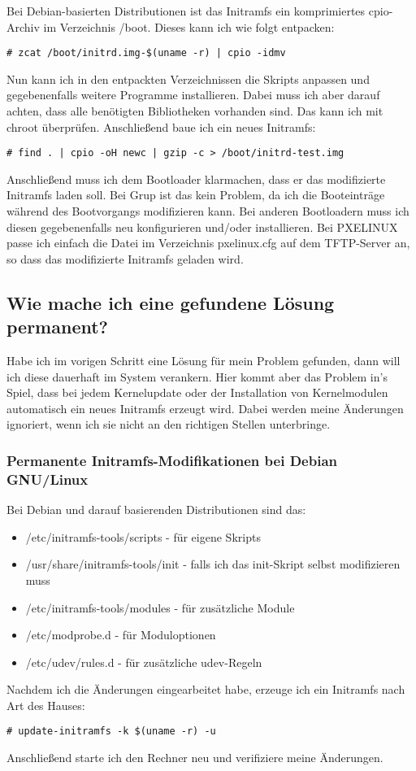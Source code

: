 Bei Debian-basierten Distributionen ist das Initramfs ein komprimiertes
cpio-Archiv im Verzeichnis /boot.
Dieses kann ich wie folgt entpacken:
\begin{verbatim}
# zcat /boot/initrd.img-$(uname -r) | cpio -idmv
\end{verbatim}
Nun kann ich in den entpackten Verzeichnissen die Skripts anpassen und
gegebenenfalls weitere Programme installieren.
Dabei muss ich aber darauf achten, dass alle benötigten Bibliotheken vorhanden
sind.
Das kann ich mit chroot überprüfen.
Anschließend baue ich ein neues Initramfs:
\begin{verbatim}
# find . | cpio -oH newc | gzip -c > /boot/initrd-test.img
\end{verbatim}
Anschließend muss ich dem Bootloader klarmachen, dass er das modifizierte
Initramfs laden soll.
Bei Grup ist das kein Problem, da ich die Booteinträge während des
Bootvorgangs modifizieren kann.
Bei anderen Bootloadern muss ich diesen gegebenenfalls neu konfigurieren
und/oder installieren.
Bei PXELINUX passe ich einfach die Datei im Verzeichnis pxelinux.cfg auf dem
TFTP-Server an, so dass das modifizierte Initramfs geladen wird.

\subsection{Wie mache ich eine gefundene Lösung permanent?}

Habe ich im vorigen Schritt eine Lösung für mein Problem gefunden, dann will
ich diese dauerhaft im System verankern.
Hier kommt aber das Problem in's Spiel, dass bei jedem Kernelupdate oder der
Installation von Kernelmodulen automatisch ein neues Initramfs erzeugt wird.
Dabei werden meine Änderungen ignoriert, wenn ich sie nicht an den richtigen
Stellen unterbringe.

\subsubsection{Permanente Initramfs-Modifikationen bei Debian GNU/Linux}
Bei Debian und darauf basierenden Distributionen sind das:
\begin{itemize}
    \item /etc/initramfs-tools/scripts - für eigene Skripts
    \item /usr/share/initramfs-tools/init - falls ich das init-Skript selbst
	modifizieren muss
    \item /etc/initramfs-tools/modules - für zusätzliche Module
    \item /etc/modprobe.d - für Moduloptionen
    \item /etc/udev/rules.d - für zusätzliche udev-Regeln
\end{itemize}
Nachdem ich die Änderungen eingearbeitet habe, erzeuge ich ein Initramfs nach
Art des Hauses:
\begin{verbatim}
# update-initramfs -k $(uname -r) -u
\end{verbatim}
Anschließend starte ich den Rechner neu und verifiziere meine Änderungen.

